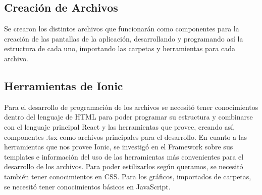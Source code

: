             \subsection{Creación de Archivos}
                Se crearon los distintos archivos que funcionarán como componentes para la creación de las pantallas de la aplicación, desarrollando y programando así la estructura de cada uno, importando las carpetas y herramientas para cada archivo.\par

            \subsection{Herramientas de Ionic}
                Para el desarrollo de programación de los archivos se necesitó tener conocimientos dentro del lenguaje de HTML para poder programar su estructura y combinarse con el lenguaje principal React y las herramientas que provee, creando así, componentes .tsx como archivos principales para el desarrollo. En cuanto a las herramientas que nos provee Ionic, se investigó en el Framework sobre sus templates e información del uso de las herramientas más convenientes para el desarrollo de los archivos. Para poder estilizarlos según queramos, se necesitó también tener conocimientos en CSS. Para los gráficos, importados de carpetas, se necesitó tener conocimientos básicos en JavaScript.\par
